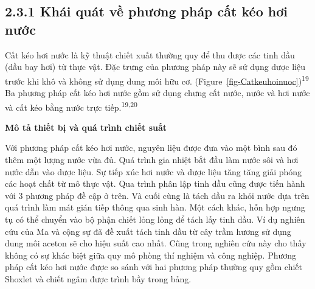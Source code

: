 \documentclass[
  twocolumn,
  landscape]{report}
\begin{document}
\subsection{2.3.1 Khái quát về phương pháp cất kéo hơi
nước}\label{khuxe1i-quuxe1t-vux1ec1-phux1b0ux1a1ng-phuxe1p-cux1ea5t-kuxe9o-hux1a1i-nux1b0ux1edbc}

Cất kéo hơi nước là kỹ thuật chiết xuất thường quy để thu được các tinh
dầu (dầu bay hơi) từ thực vật. Đặc trưng của phương pháp này sẽ sử dụng
dược liệu trước khi khô và không sử dụng dung môi hữu cơ.
(Figure~\ref{fig-Catkeuhoinuoc})\textsuperscript{19} Ba phương pháp cất
kéo hơi nước gồm sử dụng chưng cất nước, nước và hơi nước và cất kéo
bằng nước trực tiếp.\textsuperscript{19,20}

\textbf{Mô tả thiết bị và quá trình chiết suất}

Với phương pháp cất kéo hơi nước, nguyên liệu được đưa vào một bình sau
đó thêm một lượng nước vừa đủ. Quá trình gia nhiệt bắt đầu làm nước sôi
và hơi nước dẫn vào dược liệu. Sự tiếp xúc hơi nước và dược liệu tăng
tăng giải phóng các hoạt chất từ mô thực vật. Qua trình phân lập tinh
dầu cũng được tiến hành với 3 phương pháp đề cập ở trên. Và cuối cùng là
tách dầu ra khỏi nước dựa trên quá trình làm mát gián tiếp thông qua
sinh hàn. Một cách khác, hỗn hợp ngưng tụ có thể chuyển vào bộ phận
chiết lỏng lỏng để tách lấy tinh dầu. Ví dụ nghiên cứu của Ma và cộng sự
đã đề xuất tách tinh dầu từ cây trầm hương sử dụng dung môi aceton sẽ
cho hiệu suất cao nhất. Cũng trong nghiên cứu này cho thấy không có sự
khác biệt giữa quy mô phòng thí nghiệm và công nghiệp. Phương pháp cất
kéo hơi nước được so sánh với hai phương pháp thường quy gồm chiết
Shoxlet và chiết ngâm được trình bầy trong bảng.
\end{document}
